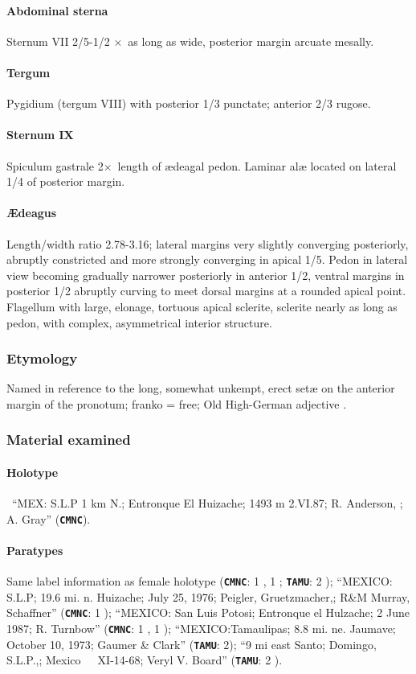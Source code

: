 \documentclass[fleqn,10pt,lineno]{wlpeerj} %
\newcommand{\x}{$\times$~}
\begin{document}
			\paragraph{Abdominal sterna}
				Sternum VII 2/5-1/2 \x as long as wide, posterior margin arcuate mesally.
			\paragraph{Tergum}
				Pygidium (tergum VIII) with posterior 1/3 punctate; anterior 2/3 rugose.
			\paragraph{Sternum IX}
				Spiculum gastrale 2\x length of {\ae}deagal pedon. Laminar al{\ae} located on lateral 1/4 of posterior margin.
			\paragraph{{\AE}deagus}
				Length/width ratio 2.78-3.16; lateral margins very slightly converging posteriorly, abruptly constricted and more strongly converging in apical 1/5.
				Pedon in lateral view becoming gradually narrower posteriorly in anterior 1/2, ventral margins in posterior 1/2 abruptly curving to meet dorsal margins at a rounded apical point.
				Flagellum with large, elonage, tortuous apical sclerite, sclerite nearly as long as pedon, with complex, asymmetrical interior structure.
		\subsubsection*{Etymology}
			Named in reference to the long, somewhat unkempt, erect set{\ae} on the anterior margin of the pronotum; franko = free; Old High-German adjective \citep{brown1956}.
		\subsubsection*{Material examined}
			\paragraph{Holotype}
				\female~``MEX: S.L.P 1 km N.; Entronque El Huizache; 1493 m 2.VI.87; R. Anderson, \underline{}; \underline{} A. Gray'' (\texttt{\textbf{CMNC}}).
			\paragraph{Paratypes}
				Same label information as female holotype (\texttt{\textbf{CMNC}}:  1 \female, 1 \male; \texttt{\textbf{TAMU}}: 2 \male);
				``MEXICO: S.L.P; 19.6 mi. n. Huizache; July 25, 1976; Peigler, Gruetzmacher,; R\&M Murray, Schaffner'' (\texttt{\textbf{CMNC}}: 1 \male);
				``MEXICO: San Luis Potosi; Entronque el Hulzache; 2 June 1987; R. Turnbow'' (\texttt{\textbf{CMNC}}: 1 \female, 1 \male);
				``MEXICO:Tamaulipas; 8.8 mi. ne. Jaumave; October 10, 1973; Gaumer \& Clark'' (\texttt{\textbf{TAMU}}: 2\female);
				``9 mi east Santo; Domingo, S.L.P.,; Mexico~~~XI-14-68; Veryl V. Board'' (\texttt{\textbf{TAMU}}: 2 \male).
\end{document}
